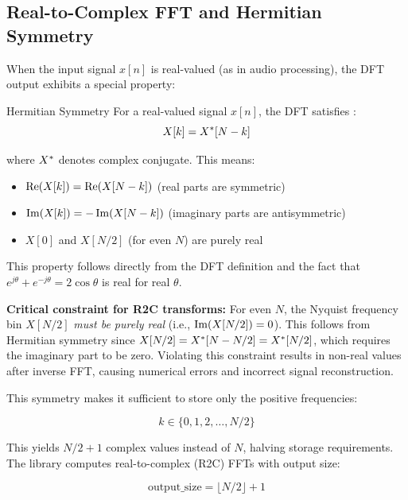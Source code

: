 \subsection{Real-to-Complex FFT and Hermitian Symmetry}\label{subsec:r2c_fft}

When the input signal $x[n]$ is real-valued (as in audio processing),
the DFT output exhibits a special property:

\begin{concept}{Hermitian Symmetry}
  For a real-valued signal $x[n]$, the DFT satisfies
  :
  \begin{equation}\label{eq:hermitian_symmetry}
    X[k] = X^*[N-k]
  \end{equation}

  where $X^*$ denotes complex conjugate. This means:
  \begin{itemize}[itemsep=2pt]
    \item $\operatorname{Re}(X[k]) = \operatorname{Re}(X[N-k])$ (real parts are symmetric)
    \item $\operatorname{Im}(X[k]) = -\operatorname{Im}(X[N-k])$ (imaginary parts are antisymmetric)
    \item $X[0]$ and $X[N/2]$ (for even $N$) are purely real
  \end{itemize}

  This property follows directly from the DFT definition and the fact
  that $e^{j\theta} + e^{-j\theta} = 2\cos\theta$ is real for real $\theta$.

  \textbf{Critical constraint for R2C transforms:} For even $N$, the
  Nyquist frequency bin $X[N/2]$ \emph{must be purely real} (i.e.,
  $\operatorname{Im}(X[N/2]) = 0$). This follows from Hermitian symmetry since
  $X[N/2] = X^*[N - N/2] = X^*[N/2]$, which requires the
  imaginary part to be zero. Violating this constraint results in
  non-real values after inverse FFT, causing numerical errors and
  incorrect signal reconstruction.
\end{concept}

This symmetry makes it sufficient to store only the positive frequencies:

\begin{equation}
  k \in \{0, 1, 2, \ldots, N/2\}
\end{equation}

This yields $N/2 + 1$ complex values instead of $N$, halving
storage requirements. The library computes real-to-complex (R2C) FFTs
with output size:

\begin{equation}
  \text{output\_size} = \lfloor N/2 \rfloor + 1
\end{equation}

